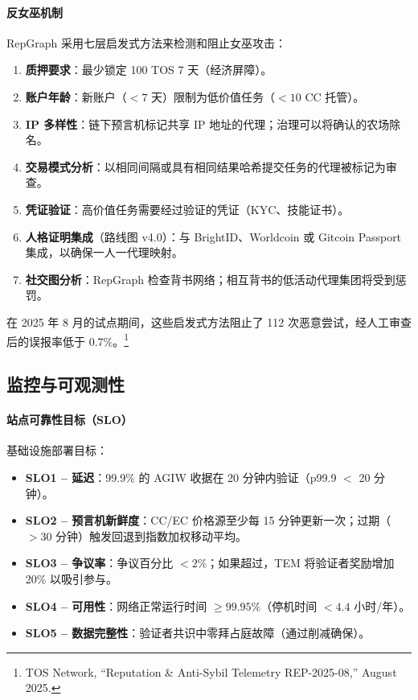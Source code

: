 \documentclass[11pt]{article}
\begin{document}
\paragraph{反女巫机制} RepGraph 采用七层启发式方法来检测和阻止女巫攻击：
\begin{enumerate}[noitemsep]
  \item \textbf{质押要求}：最少锁定 100 TOS 7 天（经济屏障）。
  \item \textbf{账户年龄}：新账户（$<7$ 天）限制为低价值任务（$<10$ CC 托管）。
  \item \textbf{IP 多样性}：链下预言机标记共享 IP 地址的代理；治理可以将确认的农场除名。
  \item \textbf{交易模式分析}：以相同间隔或具有相同结果哈希提交任务的代理被标记为审查。
  \item \textbf{凭证验证}：高价值任务需要经过验证的凭证（KYC、技能证书）。
  \item \textbf{人格证明集成}（路线图 v4.0）：与 BrightID、Worldcoin 或 Gitcoin Passport 集成，以确保一人一代理映射。
  \item \textbf{社交图分析}：RepGraph 检查背书网络；相互背书的低活动代理集团将受到惩罚。
\end{enumerate}
在 2025 年 8 月的试点期间，这些启发式方法阻止了 112 次恶意尝试，经人工审查后的误报率低于 0.7\%。\footnote{TOS Network, ``Reputation \& Anti-Sybil Telemetry REP-2025-08,'' August 2025.}

\subsection{监控与可观测性}
\paragraph{站点可靠性目标（SLO）} 基础设施部署目标：
\begin{itemize}[noitemsep]
  \item \textbf{SLO1 -- 延迟}：99.9\% 的 AGIW 收据在 20 分钟内验证（p99.9 $<$ 20 分钟）。
  \item \textbf{SLO2 -- 预言机新鲜度}：CC/EC 价格源至少每 15 分钟更新一次；过期（$>30$ 分钟）触发回退到指数加权移动平均。
  \item \textbf{SLO3 -- 争议率}：争议百分比 $<2\%$；如果超过，TEM 将验证者奖励增加 20\% 以吸引参与。
  \item \textbf{SLO4 -- 可用性}：网络正常运行时间 $\geq 99.95\%$（停机时间 $<4.4$ 小时/年）。
  \item \textbf{SLO5 -- 数据完整性}：验证者共识中零拜占庭故障（通过削减确保）。
\end{itemize}
\end{document}
